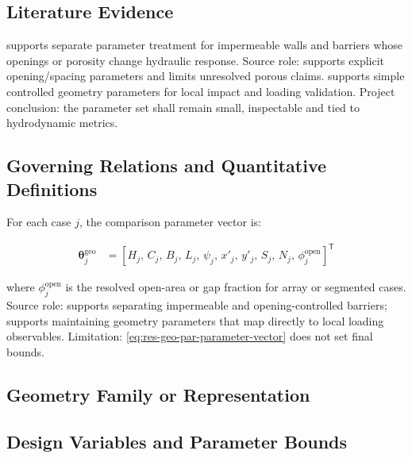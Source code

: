 \subsection{Literature Evidence}
\label{sec:res-geo-par-literature-evidence}

\textcite{deljesus2012porous} supports separate parameter treatment
for impermeable walls and barriers whose openings or porosity change
hydraulic response. Source role: supports explicit opening/spacing
parameters and limits unresolved porous claims. \textcite{watanabe2022validation}
supports simple controlled geometry parameters for local impact and
loading validation. Project conclusion: the parameter set shall remain
small, inspectable and tied to hydrodynamic metrics.

\subsection{Governing Relations and Quantitative Definitions}
\label{sec:res-geo-par-governing-relations}

For each case $j$, the comparison parameter vector is:

\begin{align}
  \boldsymbol{\theta}^{\mathrm{geo}}_j
  &=
  \left[
    H_j,\,
    C_j,\,
    B_j,\,
    L_j,\,
    \psi_j,\,
    x'_j,\,
    y'_j,\,
    S_j,\,
    N_j,\,
    \phi^{\mathrm{open}}_j
  \right]^{\mathsf{T}}
  \label{eq:res-geo-par-parameter-vector}
\end{align}

where $\phi^{\mathrm{open}}_j$ is the resolved open-area or gap
fraction for array or segmented cases. Source role:
\textcite{deljesus2012porous} supports separating impermeable and
opening-controlled barriers; \textcite{watanabe2022validation}
supports maintaining geometry parameters that map directly to local
loading observables. Limitation: \cref{eq:res-geo-par-parameter-vector}
does not set final bounds.

\subsection{Geometry Family or Representation}
\label{sec:res-geo-par-geometry-family-representation}


\subsection{Design Variables and Parameter Bounds}
\label{sec:res-geo-par-design-variables-parameter-bounds}

